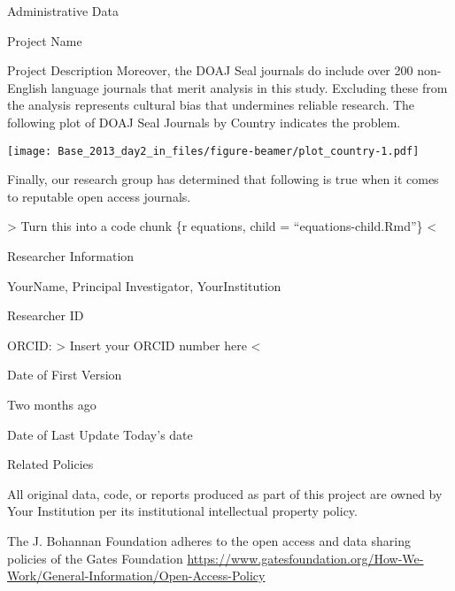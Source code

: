 \documentclass[ignorenonframetext,]{beamer}
\begin{document}
\begin{frame}{Administrative Data}
\begin{block}{Project Name}
\begin{block}{Project Description}
Moreover, the DOAJ Seal journals do include over 200 non-English
language journals that merit analysis in this study. Excluding these
from the analysis represents cultural bias that undermines reliable
research. The following plot of DOAJ Seal Journals by Country indicates
the problem.

\texttt{[image: Base\_2013\_day2\_in\_files/figure-beamer/plot\_country-1.pdf]}

Finally, our research group has determined that following is true when
it comes to reputable open access journals.

\textbar{}\textbar{}\textgreater{} Turn this into a code chunk \{r
equations, child = ``equations-child.Rmd''\}
\textless{}\textbar{}\textbar{}

\end{block}

\begin{block}{Researcher Information}

YourName, Principal Investigator, YourInstitution

Researcher ID

ORCID: \textbar{}\textbar{}\textgreater{} Insert your ORCID number here
\textless{}\textbar{}\textbar{}

Date of First Version

Two months ago

Date of Last Update Today's date

Related Policies

All original data, code, or reports produced as part of this project are
owned by Your Institution per its institutional intellectual property
policy.

The J. Bohannan Foundation adheres to the open access and data sharing
policies of the Gates Foundation
\url{https://www.gatesfoundation.org/How-We-Work/General-Information/Open-Access-Policy}

\end{block}

\end{block}

\end{frame}
\end{document}
